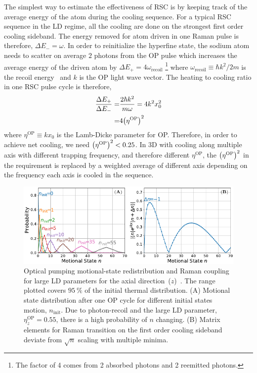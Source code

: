 The simplest way to estimate the effectiveness of RSC
is by keeping track of the average energy of the atom during the cooling sequence.
For a typical RSC sequence in the LD regime, all the cooling are done on
the strongest first order cooling sideband.
The energy removed for atom driven in one Raman pulse is therefore, $\Delta E_-=\omega$.
In order to reinitialize the hyperfine state, the sodium atom needs to scatter on average
$2$ photons from the OP pulse which increases the average energy of the driven atom
by $\Delta E_+=4\omega_{\mathrm{recoil}}$
\footnote{The factor of 4 comes from 2 absorbed photons and 2 reemitted photons.}
where $\omega_{\mathrm{recoil}}\equiv \hbar k^2/2m$ is the recoil energy~\cite{steck_sodium_2019}
and $k$ is the OP light wave vector.
The heating to cooling ratio in one RSC pulse cycle is therefore,
\begin{align*}
  \frac{\Delta E_+}{\Delta E_-}=&\frac{2\hbar k^2}{m\omega}=4k^2x_0^2\\
  =&4{\left({\eta^{\mathrm{OP}}}\right)}^2
\end{align*}
where $\eta^{\mathrm{OP}}\equiv kx_0$ is the Lamb-Dicke parameter for OP.
Therefore, in order to achieve net cooling, we need ${\left({\eta^{\mathrm{OP}}}\right)}^2<0.25$.
In 3D with cooling along multiple axis with different trapping frequency,
and therefore different $\eta^{\mathrm{OP}}$,
the ${\left({\eta^{\mathrm{OP}}}\right)}^2$ in the requirement
is replaced by a weighted average of different axis depending on the frequency
each axis is cooled in the sequence.

\begin{figure}
  \centering
  \includegraphics[width=\textwidth]{figures/na_rsc_challenges.pdf}
  \caption[Optical pumping motional-state redistribution and Raman coupling]{
    Optical pumping motional-state redistribution and Raman coupling for large LD parameters
    for the axial direction~($z$)~\cite{wineland_laser_1979}.
    The range plotted covers $95~\mathrm{\%}$ of the initial thermal distribution.
    (A) Motional state distribution after one OP cycle for different initial states motion,
    $n_{\textrm{init}}$.
    Due to photon-recoil and the large LD parameter, $\eta^{\textrm{OP}}_z=0.55$,
    there is a high probability of $n$ changing.
    (B) Matrix elements for Raman transition on the first order cooling sideband
    deviate from $\sqrt{n}$ scaling with multiple minima.
    \label{fig:rsc:na-challenges}}
\end{figure}

